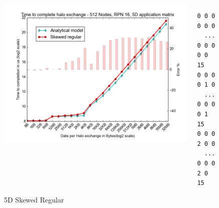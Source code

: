 \documentclass{beamer}
\begin{document}
\begin{frame}[fragile]
\begin{figure}
\caption{5D Skewed Regular}
\begin{columns}
  \begin{column}{0.6\textwidth}
    \includegraphics[width=1\textwidth]{../mappings/5d_skewed_regular.png}
  \end{column}
  \begin{column}{0.3\textwidth}
\lstset{title=Mapping sample}
\begin{lstlisting}[basicstyle=\footnotesize\ttfamily, frame=lines,columns=fixed]
0 0 0 0 0 0
  ...
0 0 0 0 0 15
0 0 0 0 1 0
  ...
0 0 0 0 1 15
0 0 0 2 0 0
  ...
0 0 0 2 0 15
\end{lstlisting}
  \end{column}
\end{columns}
\end{figure}
\end{frame}
\end{document}
